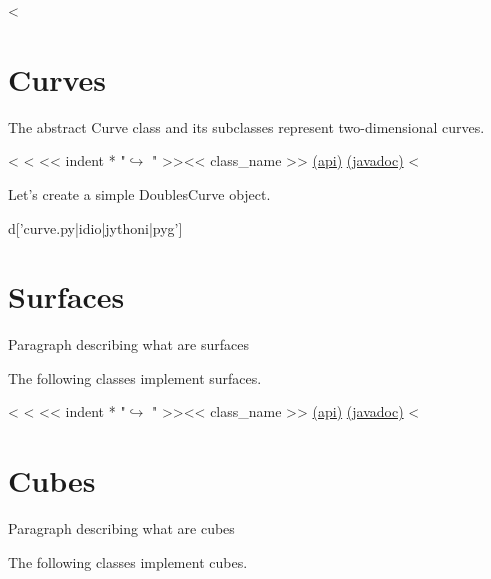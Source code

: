 <%

\section{Curves}

The abstract Curve class and its subclasses represent two-dimensional curves.

\begin{fullwidth}
<%
<%
<< indent * "$\hookrightarrow$ " >><< class_name >> \href{http://docs-static.hq.opengamma.com/0.7.0/analytics/api/<< package_name >>.html#class-<<class_name>>}{(api)} \href{http://docs-static.hq.opengamma.com/0.7.0/analytics/javadoc/<< class_name.replace(".","/") >>.html}{(javadoc)}
<%
\end{fullwidth}

Let's create a simple DoublesCurve object.

{{ d['curve.py|idio|jythoni|pyg'] }}

\section{Surfaces}

Paragraph describing what are surfaces

The following classes implement surfaces.

\begin{fullwidth}
<%
<%
<< indent * "$\hookrightarrow$ " >><< class_name >> \href{http://docs-static.hq.opengamma.com/0.7.0/analytics/api/<< package_name >>.html#class-<<class_name>>}{(api)} \href{http://docs-static.hq.opengamma.com/0.7.0/analytics/javadoc/<< class_name.replace(".","/") >>.html}{(javadoc)}
<%
\end{fullwidth}

\section{Cubes}

Paragraph describing what are cubes

The following classes implement cubes.


